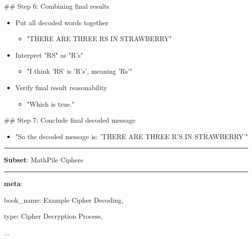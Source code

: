 \documentclass{article}
\begin{document}
\begin{tcolorbox}[colback=wkblue!10!white, colframe=wkblue!100!blue, left=2mm, right=2mm, title=\small\textcolor{black}{A document from \textsc{MathPile}-Ciphers}]
\begin{tiny}
\vspace{1.6mm}

\#\# Step 6: Combining final results

\begin{itemize}
    \item Put all decoded words together
    \begin{itemize}
        \item "THERE ARE THREE RS IN STRAWBERRY"
    \end{itemize}
    \item Interpret "RS" as "R's"
    \begin{itemize}
        \item "I think 'RS' is 'R's', meaning 'Rs'"
    \end{itemize}
    \item Verify final result reasonability
    \begin{itemize}
        \item "Which is true."
    \end{itemize}
\end{itemize}

\vspace{1.6mm}

\#\# Step 7: Conclude final decoded message

\begin{itemize}
    \item "So the decoded message is: 'THERE ARE THREE R'S IN STRAWBERRY'"
\end{itemize}

\vspace{1.6mm}

\textcolor{wkblue}{\rule{\linewidth}{0.4pt}}

\textcolor{meta-color}{\textbf{Subset}}: MathPile Ciphers

\textcolor{wkblue}{\rule{\linewidth}{0.4pt}}

\textcolor{meta-color}{\textbf{meta}}: 

\hspace*{4mm}book\_name: Example Cipher Decoding, 

\hspace*{4mm}type: Cipher Decryption Process, 

\hspace*{4mm}...
\end{tiny}
\end{tcolorbox}
\end{document}
